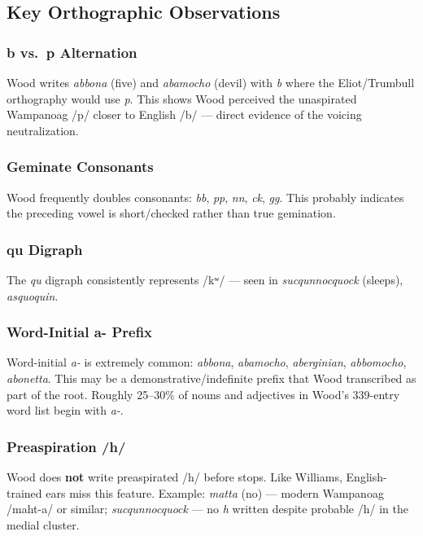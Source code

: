 \subsection{Key Orthographic Observations}

\subsubsection{b vs.\ p Alternation}

Wood writes \emph{abbona} (five) and \emph{abamocho} (devil) with \emph{b}
where the Eliot/Trumbull orthography would use \emph{p}. This shows Wood
perceived the unaspirated Wampanoag /p/ closer to English /b/ --- direct
evidence of the voicing neutralization.

\subsubsection{Geminate Consonants}

Wood frequently doubles consonants: \emph{bb}, \emph{pp}, \emph{nn}, \emph{ck},
\emph{gg}. This probably indicates the preceding vowel is short/checked rather
than true gemination.

\subsubsection{qu Digraph}

The \emph{qu} digraph consistently represents /kʷ/ --- seen in
\emph{sucqunnocquock} (sleeps), \emph{asquoquin}.

\subsubsection{Word-Initial a- Prefix}

Word-initial \emph{a-} is extremely common: \emph{abbona}, \emph{abamocho},
\emph{aberginian}, \emph{abbomocho}, \emph{abonetta}. This may be a
demonstrative/indefinite prefix that Wood transcribed as part of the root.
Roughly 25--30\% of nouns and adjectives in Wood's 339-entry word list begin
with \emph{a-}.

\subsubsection{Preaspiration /h/}

Wood does \textbf{not} write preaspirated /h/ before stops. Like Williams,
English-trained ears miss this feature. Example: \emph{matta} (no) --- modern
Wampanoag /maht-a/ or similar; \emph{sucqunnocquock} --- no \emph{h} written
despite probable /h/ in the medial cluster.

